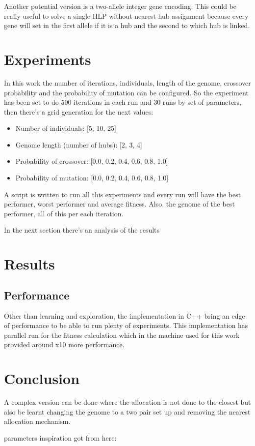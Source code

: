 \documentclass[12pt,oneside,a4paper]{article}
\begin{document}
    Another potential version is a two-allele integer gene encoding.
    This could be really useful to solve a single-HLP without nearest hub assignment because every gene will set in
    the first allele if it is a hub and the second to which hub is linked.


    \section{Experiments}

    In this work the number of iterations, individuals, length of the genome, crossover probability and the
    probability of mutation can be configured.
    So the experiment has been set to do 500 iterations in each run and 30 runs by set of parameters, then there's a
    grid generation for the next values:
    \begin{itemize}
        \item Number of individuals: [5, 10, 25]
        \item Genome length (number of hubs): [2, 3, 4]
        \item Probability of crossover: [0.0, 0.2, 0.4, 0.6, 0.8, 1.0]
        \item Probability of mutation: [0.0, 0.2, 0.4, 0.6, 0.8, 1.0]
    \end{itemize}

    A script is written to run all this experiments and every run will have the best performer, worst performer and
    average fitness.
    Also, the genome of the best performer, all of this per each iteration.

    In the next section there's an analysis of the results


    \section{Results}

    \subsection{Performance}
    Other than learning and exploration, the implementation in C++ bring an edge of performance to be able to run
    plenty of experiments.
    This implementation has parallel run for the fitness calculation which in the machine used for this work provided
    around x10 more performance.


    \section{Conclusion}

    A complex version can be done where the allocation is not done to the closest but also be learnt changing the
    genome to a two pair set up and removing the nearest allocation mechanism. \cite{Capacitated_allo_Zorica}


    parameters inspiration got from here: \cite{Zhou2016/09}


    \newpage
    
    
\end{document}
